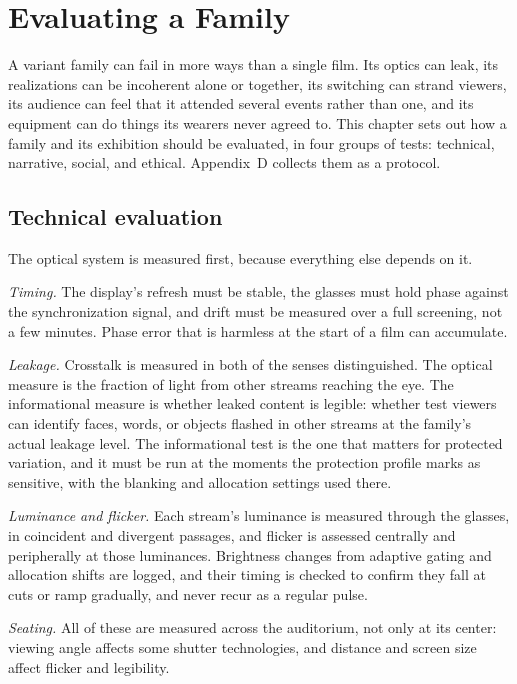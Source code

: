 \chapter{Evaluating a Family}\label{ch:evaluation}

A variant family can fail in more ways than a single film. Its optics can leak, its realizations can be incoherent alone or together, its switching can strand viewers, its audience can feel that it attended several events rather than one, and its equipment can do things its wearers never agreed to. This chapter sets out how a family and its exhibition should be evaluated, in four groups of tests: technical, narrative, social, and ethical. Appendix~D collects them as a protocol.

\section{Technical evaluation}

The optical system is measured first, because everything else depends on it.

\emph{Timing.} The display's refresh must be stable, the glasses must hold phase against the synchronization signal, and drift must be measured over a full screening, not a few minutes. Phase error that is harmless at the start of a film can accumulate.

\emph{Leakage.} Crosstalk is measured in both of the senses  distinguished. The optical measure is the fraction of light from other streams reaching the eye. The informational measure is whether leaked content is legible: whether test viewers can identify faces, words, or objects flashed in other streams at the family's actual leakage level. The informational test is the one that matters for protected variation, and it must be run at the moments the protection profile marks as sensitive, with the blanking and allocation settings used there.

\emph{Luminance and flicker.} Each stream's luminance is measured through the glasses, in coincident and divergent passages, and flicker is assessed centrally and peripherally at those luminances. Brightness changes from adaptive gating and allocation shifts are logged, and their timing is checked to confirm they fall at cuts or ramp gradually, and never recur as a regular pulse.

\emph{Seating.} All of these are measured across the auditorium, not only at its center: viewing angle affects some shutter technologies, and distance and screen size affect flicker and legibility.

